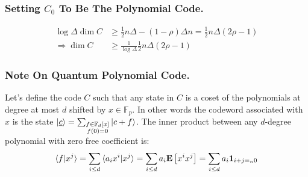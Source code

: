   \subsubsection{Setting $C_{0}$ To Be The Polynomial Code.}
  
  \begin{equation*}
    \begin{split}
     \log \Delta \dim C & \ge \frac{1}{2}n\Delta  - \left( 1- \rho  \right) \Delta n = \frac{1}{2}n\Delta\left( 2\rho - 1 \right)  \\
     \Rightarrow  \dim C & \ge \frac{1}{\log \Delta} \frac{1}{2}n\Delta\left( 2\rho - 1 \right)  
    \end{split}
  \end{equation*}


\subsubsection{Note On Quantum Polynomial Code.} 
Let's define the code $C$ such that any state in $C$ is a coset of the polynomials at degree at most $d$ shifted by $x \in \mathbb{F}_{p}$. In other words the codeword associated with $x$ is the state $\ket{\underline{c}} = \sum_{ \substack{ f \in \mathbb{F}_{d}[x] \\  f(0) = 0}}{ \ket{ c + f}} $. The inner product between any $d$-degree polynomial with zero free coefficient is:
\begin{equation*}
  \begin{split}
    \braket{ f | x^{j} } = \sum_{i \le d }{ \braket{a_{i} x^{i} | x^{j}}} = \sum_{i \le d}{ a_{i} \mathbf{E} \left[ { x^{i}x^{j}   } \right]} =  \sum_{i \le d}{ a_{i } \mathbf{1}_{ i + j =_{n} 0 }}
  \end{split}
\end{equation*}


